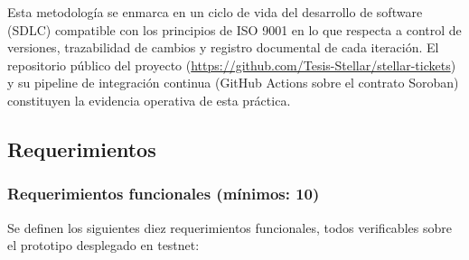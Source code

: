 Esta metodología se enmarca en un ciclo de vida del desarrollo de software (SDLC) compatible con los principios de ISO 9001 en lo que respecta a control de versiones, trazabilidad de cambios y registro documental de cada iteración. El repositorio público del proyecto (\url{https://github.com/Tesis-Stellar/stellar-tickets}) y su pipeline de integración continua (GitHub Actions sobre el contrato Soroban) constituyen la evidencia operativa de esta práctica.

\subsection{Requerimientos}

\subsubsection{Requerimientos funcionales (mínimos: 10)}

Se definen los siguientes diez requerimientos funcionales, todos verificables sobre el prototipo desplegado en testnet:

